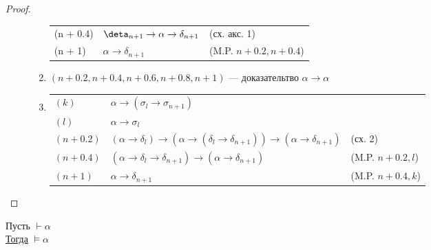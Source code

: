 \documentclass[oneside]{book}
\begin{document}
\begin{proof}
\begin{description}
\begin{enumerate}
\begin{center}
\begin{tabular}{l|ll}
						      (n + 0.4) & \(\deta_{n + 1} \to \alpha \to \delta_{n + 1}\) & (сх. акс. 1)                \\
						      (n + 1)   & \(\alpha \to \delta_{n + 1}\)                   & (M.P. \(n + 0.2, n + 0.4\)) \\
					      \end{tabular}
				      \end{center}
				\item \((n + 0.2, n + 0.4, n+0.6, n+0.8, n+1)\) --- доказательтво \(\alpha \to \alpha\)
				\item \-
				      \begin{center}
					      \begin{tabular}{lll}
						      \((k)\)       & \(\alpha \to (\sigma_l \to \sigma_{n + 1})\)                                                             &                       \\
						      \((l)\)       & \(\alpha \to \sigma_l\)                                                                                  &                       \\
						      \((n + 0.2)\) & \((\alpha \to \delta_l) \to (\alpha \to (\delta_l \to \delta_{n + 1})) \to (\alpha \to \delta_{n + 1})\) & (сх. 2)               \\
						      \((n + 0.4)\) & \((\alpha \to \delta_l \to \delta_{n + 1}) \to (\alpha \to \delta_{n + 1})\)                             & (M.P. \(n + 0.2, l\)) \\
						      \((n + 1)\)   & \(\alpha \to \delta_{n + 1}\)                                                                            & (M.P. \(n + 0.4, k\)) \\
					      \end{tabular}
				      \end{center}
			\end{enumerate}
	\end{description}
\end{proof}
\begin{theorem}[о корректности]
	Пусть \(\vdash \alpha\) \\
	\uline{Тогда} \(\vDash \alpha\)
	\label{org00d6bba}
\end{theorem}
\end{document}

